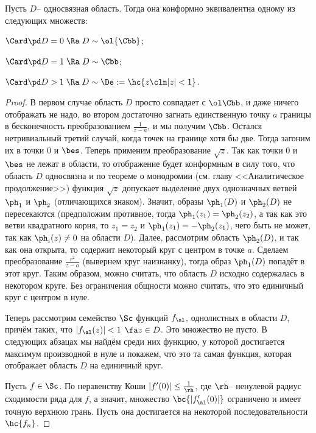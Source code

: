 \documentclass[a4paper]{article}
\begin{document}
\begin{theorem}
Пусть $D$-- односвязная область. Тогда она конформно эквивалентна одному из следующих множеств:
\begin{items}{-2}
\item $\Card \pd D = 0 \; \Ra \; D \sim \ol{\Cbb}$;
\item $\Card \pd D = 1 \; \Ra \; D \sim \Cbb$;
\item $\Card \pd D > 1 \; \Ra \; D \sim \De := \hc{z\cln |z|<1}$.
\end{items}
\end{theorem}
\begin{proof}
В первом случае область $D$ просто совпадает с $\ol\Cbb$, и даже ничего отображать не надо, во втором достаточно загнать
единственную точку $a$ границы в бесконечность преобразованием $\frac{1}{z-a}$, и мы получим $\Cbb$.
Остался нетривиальный третий случай, когда точек на границе хотя бы две. Тогда загоним их в точки $0$ и $\bes$.
Теперь применим преобразование $\sqrt{z}$. Так как точки $0$ и $\bes$ не лежат в области, то отображение будет конформным
в силу того, что область $D$ односвязна и по теореме о монодромии (см. главу <<Аналитическое продолжение>>) функция $\sqrt{z}$
допускает выделение двух однозначных ветвей $\ph_1$ и $\ph_2$ (отличающихся знаком). Значит, образы $\ph_1(D)$ и $\ph_2(D)$
не пересекаются (предположим противное, тогда $\ph_1(z_1)=\ph_2(z_2)$, а так как это ветви квадратного корня, то
$z_1=z_2$ и $\ph_1(z_1) = -\ph_2(z_1)$, чего быть не может, так как $\ph_i(z)\neq 0$ на области $D$).
Далее, рассмотрим область $\ph_2(D)$, и так как она открыта, то содержит некоторый круг с центром в точке $a$.
Сделаем преобразование $\frac{r^2}{z-a}$ (вывернем круг наизнанку), тогда образ $\ph_1(D)$ попадёт в этот круг.
Таким образом, можно считать, что область $D$ исходно содержалась
в некотором круге. Без ограничения общности можно считать, что это единичный круг с центром в нуле.

Теперь рассмотрим семейство $\Sc$ функций $f_\al$, однолистных в области $D$, причём  таких, что $|f_\al(z)| < 1$ $\fa z \in D$. Это множество не пусто. В следующих абзацах мы найдём среди них функцию, у которой достигается максимум производной в нуле и покажем, что это та самая функция, которая отображает область $D$ на единичный круг.

Пусть $f \in \Sc$. По неравенству Коши $|f'(0)| \le \frac{1}{\rh}$, где $\rh$-- ненулевой радиус
сходимости ряда для $f$, а значит, множество $\bc{|f_\al'(0)|}$ ограничено и имеет точную верхнюю грань. Пусть она достигается на некоторой последовательности $\hc{f_n}$.


\end{proof}
\end{document}
